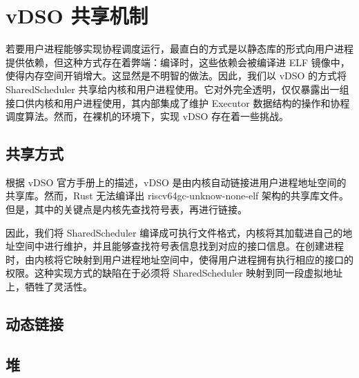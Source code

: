 \section{vDSO 共享机制}

若要用户进程能够实现协程调度运行，最直白的方式是以静态库的形式向用户进程提供依赖，但这种方式存在着弊端：编译时，这些依赖会被编译进 ELF 镜像中，使得内存空间开销增大。这显然是不明智的做法。因此，我们以 vDSO 的方式将 SharedScheduler 共享给内核和用户进程使用。它对外完全透明，仅仅暴露出一组接口供内核和用户进程使用，其内部集成了维护 Executor 数据结构的操作和协程调度算法。然而，在裸机的环境下，实现 vDSO 存在着一些挑战。

\subsection{共享方式}

根据 vDSO 官方手册上的描述，vDSO 是由内核自动链接进用户进程地址空间的共享库。然而，Rust 无法编译出 riscv64gc-unknow-none-elf 架构的共享库文件。但是，其中的关键点是内核先查找符号表，再进行链接。

因此，我们将 SharedScheduler 编译成可执行文件格式，内核将其加载进自己的地址空间中进行维护，并且能够查找符号表信息找到对应的接口信息。在创建进程时，由内核将它映射到用户进程地址空间中，使得用户进程拥有执行相应的接口的权限。这种实现方式的缺陷在于必须将 SharedScheduler 映射到同一段虚拟地址上，牺牲了灵活性。

\subsection{动态链接}



\subsection{堆}

